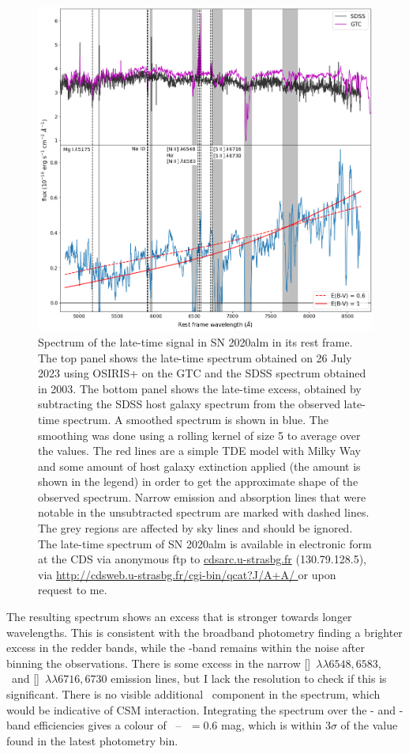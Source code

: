 \documentclass[a4paper,oneside,12pt, class=Latex/Classes/PhDthesisPSnPDF, crop=false]{standalone}
\begin{document}
\begin{figure}
 \centering
 \includegraphics[width=\textwidth]{../Images/chapter_3/spec_obj.png}
 \caption{Spectrum of the late-time signal in SN 2020alm in its rest frame. The top panel shows the late-time spectrum obtained on 26 July 2023 using OSIRIS+ on the GTC and the SDSS spectrum obtained in 2003. The bottom panel shows the late-time excess, obtained by subtracting the SDSS host galaxy spectrum from the observed late-time spectrum. A smoothed spectrum is shown in blue. The smoothing was done using a rolling kernel of size 5 to average over the values. The red lines are a simple TDE model with Milky Way and some amount of host galaxy extinction applied (the amount is shown in the legend) in order to get the approximate shape of the observed spectrum. Narrow emission and absorption lines that were notable in the unsubtracted spectrum are marked with dashed lines. The grey regions are affected by sky lines and should be ignored. The late-time spectrum of SN 2020alm is available in electronic form at the CDS via anonymous ftp to \url{cdsarc.u-strasbg.fr} (130.79.128.5), via \url{http://cdsweb.u-strasbg.fr/cgi-bin/qcat?J/A+A/ }or upon request to me.}
 \label{ZTF20aaifyfx_spec}
\end{figure}

The resulting spectrum shows an excess that is stronger towards longer wavelengths. This is consistent with the broadband photometry finding a brighter excess in the redder bands, while the \ztfg-band remains within the noise after binning the observations. There is some excess in the narrow [\NII]~${\lambda\lambda6548,6583}$, \Halpha~and [\SII]~${\lambda\lambda6716,6730}$ emission lines, but I lack the resolution to check if this is significant. There is no visible additional \Halpha~component in the spectrum, which would be indicative of CSM interaction. Integrating the spectrum over the \ztfr- and \ztfi-band efficiencies gives a colour of \ztfr~--~\ztfi\,$= 0.6$ mag, which is within $3\sigma$ of the value found in the latest photometry bin.
\end{document}
